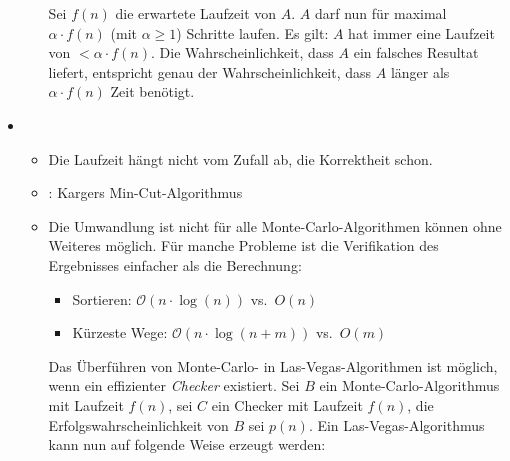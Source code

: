 \documentclass{scrartcl}%
\begin{document}
\begin{itemize}
\begin{itemize}
            Sei $f(n)$ die erwartete Laufzeit von $A$. $A$ darf nun für maximal $\alpha \cdot f(n)$
            (mit $\alpha \geq 1$) Schritte laufen.
            Es gilt: $A$ hat immer eine Laufzeit von $< \alpha \cdot f(n)$.
            Die Wahrscheinlichkeit, dass $A$ ein falsches Resultat liefert,
            entspricht genau der Wahrscheinlichkeit, dass $A$ länger als $\alpha \cdot f(n)$ Zeit benötigt.
        \end{itemize}
        \item {}
        \begin{itemize}
            \item {} Die Laufzeit hängt nicht vom Zufall ab, die Korrektheit schon.
            \item {}: Kargers Min-Cut-Algorithmus
            \item {}
            Die Umwandlung ist nicht für alle Monte-Carlo-Algorithmen können ohne Weiteres möglich.
            Für manche Probleme ist die Verifikation des Ergebnisses einfacher als die Berechnung:
            \begin{itemize}
                \item Sortieren: $\mathcal{O}(n \cdot \log(n))$ vs.\ $O(n)$
                \item Kürzeste Wege: $\mathcal{O}(n \cdot \log(n+m))$ vs.\ $O(m)$
            \end{itemize}
            Das Überführen von Monte-Carlo- in Las-Vegas-Algorithmen ist möglich,
            wenn ein effizienter \textit{Checker} existiert. Sei $B$ ein Monte-Carlo-Algorithmus mit Laufzeit $f(n)$,
            sei $C$ ein Checker mit Laufzeit $f(n)$, die Erfolgswahrscheinlichkeit von $B$ sei $p(n)$.
            \newpage
            Ein Las-Vegas-Algorithmus kann nun auf folgende Weise erzeugt werden:
            \begin{figure}[H]
                \centering
                \begin{minipage}{.55\linewidth}
                    \begin{algorithmic}
                        \ELSE
                        \ENDIF
                    \end{algorithmic}
                \end{minipage}
            \end{figure}


\end{itemize}
\end{itemize}
\end{document}
